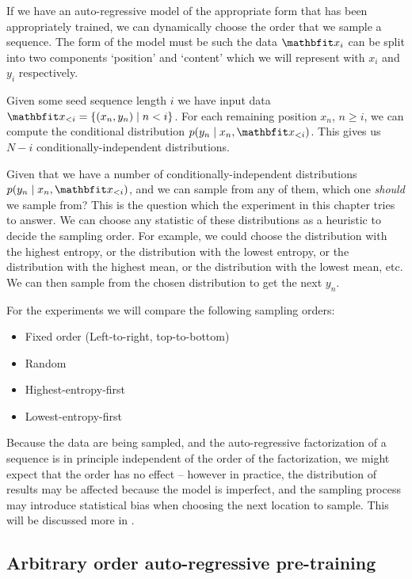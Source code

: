 If we have an auto-regressive model of the appropriate form that has been appropriately trained, we can dynamically choose the order that we sample a sequence. The form of the model must be such the data $\x_i$ can be split into two components `position' and `content' which we will represent with $x_i$ and $y_i$ respectively.

Given some seed sequence length $i$ we have input data $\x_{<i} = \{ (x_n, y_n) \mid n < i \}$. For each remaining position $x_n$, $n ≥ i$, we can compute the conditional distribution $p(y_n \mid x_n,  \x_{<i})$. This gives us $N - i$ conditionally-independent distributions.

Given that we have a number of conditionally-independent distributions $p(y_n \mid x_n,  \x_{<i})$, and we can sample from any of them, which one \textit{should} we sample from? This is the question which the experiment in this chapter tries to answer. We can choose any statistic of these distributions as a heuristic to decide the sampling order. For example, we could choose the distribution with the highest entropy, or the distribution with the lowest entropy, or the distribution with the highest mean, or the distribution with the lowest mean, etc. We can then sample from the chosen distribution to get the next $y_n$.

For the experiments we will compare the following sampling orders:
\begin{itemize}
    \item Fixed order (Left-to-right, top-to-bottom)
    \item Random
    \item Highest-entropy-first
    \item Lowest-entropy-first
\end{itemize}

Because the data are being sampled, and the auto-regressive factorization of a sequence is in principle independent of the order of the factorization, we might expect that the order has no effect -- however in practice, the distribution of results may be affected because the model is imperfect, and the sampling process may introduce statistical bias when choosing the next location to sample. This will be discussed more in .

\subsection{Arbitrary order auto-regressive pre-training}
\label{sss:pretraining-triples}

